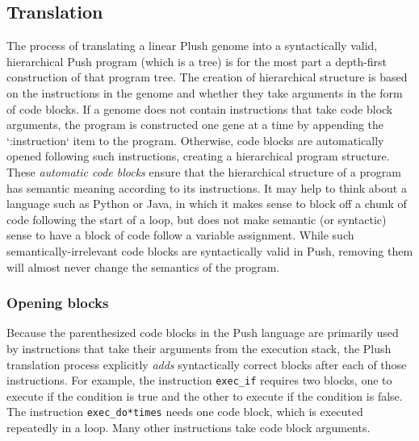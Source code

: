 \documentclass[graybox]{svmult}
\begin{document}
\subsection{Translation}

The process of translating a linear Plush genome into a syntactically valid, hierarchical Push program (which is a tree) is for the most part a depth-first construction of that program tree. The creation of hierarchical structure is based on the instructions in the genome and whether they take arguments in the form of code blocks. If a genome does not contain instructions that take code block arguments, the program is constructed one gene at a time by appending the `:instruction` item to the program. Otherwise, code blocks are automatically opened following such instructions, creating a hierarchical program structure. These \textit{automatic code blocks} ensure that the hierarchical structure of a program has semantic meaning according to its instructions. It may help to think about a language such as Python or Java, in which it makes sense to block off a chunk of code following the start of a loop, but does not make semantic (or syntactic) sense to have a block of code follow a variable assignment. While such semantically-irrelevant code blocks are syntactically valid in Push, removing them will almost never change the semantics of the program.

\subsubsection{Opening blocks}

Because the parenthesized code blocks in the Push language are primarily
used by instructions that take their arguments from the execution stack,
the Plush translation process explicitly \textit{adds} syntactically correct
blocks after each of those instructions. For example, the instruction
\texttt{exec\_if} requires two blocks, one to execute if the condition is true and the other to execute if the condition is false. The instruction \texttt{exec\_do*times} needs one code block, which is executed repeatedly in a loop. Many other instructions take code block arguments.

\end{document}
